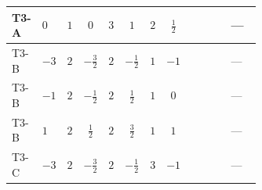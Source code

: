 \documentclass[8pt]{article}
\begin{document}
\begin{landscape}
\begin{longtable}{@{}llcccccc >{\raggedright\arraybackslash}p{0.21\linewidth} >{\raggedright\arraybackslash}p{0.21\linewidth} >{\raggedright\arraybackslash}p{0.21\linewidth}@{}}
\midrule
T3-A & $0$ & $1$ & $0$ & $3$ & $1$ & $2$ & $\frac{1}{2}$ & \scriptsize\adjustbox{max width=\linewidth}{$\begin{gathered} +8 {\lambda_{HS_2}^{(1)}} {\lambda_{HS_2}^{(A)}}\end{gathered}$} & \scriptsize\adjustbox{max width=\linewidth}{$\begin{gathered} +2 {\lambda_{HS_2}^{(A)}} {\lambda_{S_2}^{(1)}}\end{gathered}$} & --- \\
\midrule
T3-B & $-3$ & $2$ & $-\frac{3}{2}$ & $2$ & $-\frac{1}{2}$ & $1$ & $-1$ & \scriptsize\adjustbox{max width=\linewidth}{$\begin{gathered} +8 {\lambda_{HS_2}^{(1)}} {\lambda_{HS_2}^{(A)}}\end{gathered}$} & \scriptsize\adjustbox{max width=\linewidth}{$\begin{gathered} +2 {\lambda_{HS_2}^{(A)}} {\lambda_{S_2}^{(1)}}\end{gathered}$} & --- \\
\midrule
T3-B & $-1$ & $2$ & $-\frac{1}{2}$ & $2$ & $\frac{1}{2}$ & $1$ & $0$ & \scriptsize\adjustbox{max width=\linewidth}{$\begin{gathered} +8 {\lambda_{HS_2}^{(1)}} {\lambda_{HS_2}^{(A)}}\end{gathered}$} & \scriptsize\adjustbox{max width=\linewidth}{$\begin{gathered} +2 {\lambda_{HS_2}^{(A)}} {\lambda_{S_2}^{(1)}}\end{gathered}$} & --- \\
\midrule
T3-B & $1$ & $2$ & $\frac{1}{2}$ & $2$ & $\frac{3}{2}$ & $1$ & $1$ & \scriptsize\adjustbox{max width=\linewidth}{$\begin{gathered} +8 {\lambda_{HS_2}^{(1)}} {\lambda_{HS_2}^{(A)}}\end{gathered}$} & \scriptsize\adjustbox{max width=\linewidth}{$\begin{gathered} +2 {\lambda_{HS_2}^{(A)}} {\lambda_{S_2}^{(1)}}\end{gathered}$} & --- \\
\midrule
T3-C & $-3$ & $2$ & $-\frac{3}{2}$ & $2$ & $-\frac{1}{2}$ & $3$ & $-1$ & \scriptsize\adjustbox{max width=\linewidth}{$\begin{gathered} +8 {\lambda_{HS_2}^{(1)}} {\lambda_{HS_2}^{(A)}}\end{gathered}$} & \scriptsize\adjustbox{max width=\linewidth}{$\begin{gathered} +2 {\lambda_{HS_2}^{(A)}} {\lambda_{S_2}^{(1)}}\end{gathered}$} & --- \\

\end{longtable}
\end{landscape}
\end{document}
